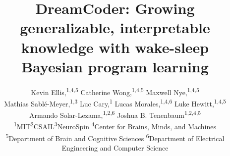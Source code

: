 \documentclass[12pt]{article}
\title{%
  DreamCoder: Growing generalizable, interpretable knowledge with wake-sleep Bayesian program learning}
\author{Kevin Ellis,\textsuperscript{1,4,5} Catherine Wong,\textsuperscript{1,4,5} Maxwell Nye,\textsuperscript{1,4,5} \\ Mathias Sabl\'e-Meyer,\textsuperscript{1,3}  Luc Cary,\textsuperscript{1} Lucas Morales,\textsuperscript{1,4,6} Luke Hewitt,\textsuperscript{1,4,5}\\Armando Solar-Lezama,\textsuperscript{1,2,6} Joshua B. Tenenbaum\textsuperscript{1,2,4,5}\\%
\small  \textsuperscript{1}MIT\phantom{tt}\textsuperscript{2}CSAIL\phantom{tt}\textsuperscript{3}NeuroSpin%
\small  \phantom{tt}\textsuperscript{4}Center for Brains, Minds, and Machines\\%
\small\textsuperscript{5}Department of Brain and Cognitive Sciences\phantom{tt}%
\small\textsuperscript{6}Department of Electrical Engineering and Computer Science%
}
\date{}
\newenvironment{sciabstract}{%
  \begin{quote} \bf}
{\end{quote}}
\begin{document}

\maketitle{}

  
\end{document}
